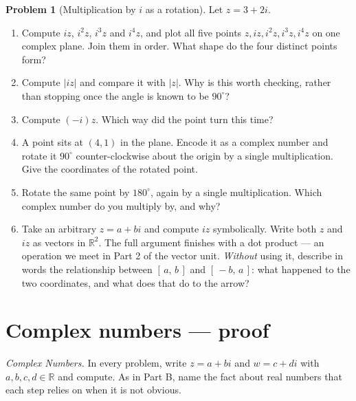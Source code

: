 \documentclass[11pt]{article}
\theoremstyle{definition}
\newtheorem{prob}{Problem}[section]
\newcommand{\R}{\mathbb{R}}
\begin{document}
\begin{prob}[Multiplication by $i$ as a rotation]
Let $z = 3+2i$.

\begin{enumerate}[label=\textbf{(\alph*)},leftmargin=2.6em,itemsep=7pt,topsep=6pt]
  \item Compute $iz$, $i^{2}z$, $i^{3}z$ and $i^{4}z$, and plot all five points
        $z, iz, i^{2}z, i^{3}z, i^{4}z$ on one complex plane. Join them in order.
        What shape do the four distinct points form?
  \item Compute $\lvert iz\rvert$ and compare it with $\lvert z\rvert$. Why is
        this worth checking, rather than stopping once the angle is known to be
        $90^{\circ}$?
  \item Compute $(-i)z$. Which way did the point turn this time?
  \item A point sits at $(4,1)$ in the plane. Encode it as a complex number and
        rotate it $90^{\circ}$ counter-clockwise about the origin by a single
        multiplication. Give the coordinates of the rotated point.
  \item Rotate the same point by $180^{\circ}$, again by a single multiplication.
        Which complex number do you multiply by, and why?
  \item Take an arbitrary $z=a+bi$ and compute $iz$ symbolically. Write both $z$
        and $iz$ as vectors in $\R^{2}$. The full argument finishes with a dot
        product --- an operation we meet in Part 2 of the vector unit.
        \emph{Without} using it, describe in words the relationship between
        $[\,a,\,b\,]$ and $[\,-b,\,a\,]$: what happened to the two coordinates,
        and what does that do to the arrow?
\end{enumerate}
\end{prob}

\section{Complex numbers --- proof}
\emph{Complex Numbers.} In every problem, write $z=a+bi$ and $w=c+di$ with
$a,b,c,d\in\R$ and compute. As in Part B, name the fact about real numbers that
each step relies on when it is not obvious.
\end{document}
